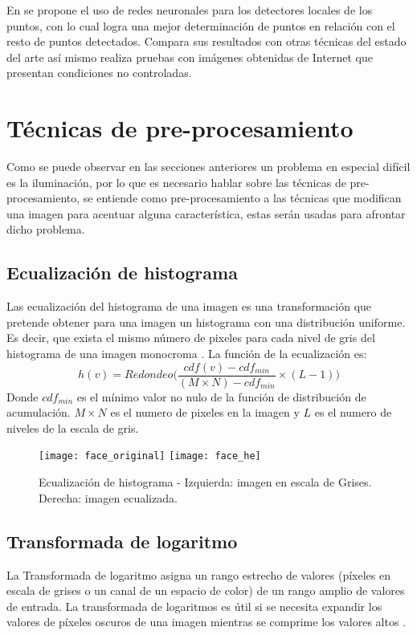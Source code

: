 En \cite{baltrusaitis2013constrained} se propone el uso de redes neuronales para los detectores locales de los puntos, con lo cual logra una mejor determinación de puntos en relación con el resto de puntos detectados. Compara sus resultados con otras técnicas del estado del arte así mismo realiza pruebas con imágenes obtenidas de Internet que presentan condiciones no controladas.

\section{Técnicas de pre-procesamiento}
Como se puede observar en las secciones anteriores un problema en especial difícil es la iluminación, por lo que es necesario hablar sobre las técnicas de pre-procesamiento, se entiende como pre-procesamiento a las técnicas que modifican una imagen para acentuar alguna característica, estas serán usadas para afrontar dicho problema.

\subsection{Ecualización de histograma}
Las ecualización del histograma de una imagen es una transformación que pretende obtener para una imagen un histograma con una distribución uniforme. Es decir, que exista el mismo número de pixeles para cada nivel de gris del histograma de una imagen monocroma \citep{orlova2002image}.
La función de la ecualización es:
\begin{equation}
h(v)=Redondeo\Bigg(\frac{cdf(v)-cdf_{min}}{(M\times N)-cdf_{min}} \times (L-1)\Bigg)
\end{equation}
Donde $cdf_{min}$ es el mínimo valor no nulo de la función de distribución de acumulación. $M\times N$ es el numero de pixeles en la imagen y $L$ es el numero de niveles de la escala de gris.

\begin{figure}[h]
\center
\texttt{[image: face\_original]}
\hspace{1cm}
\texttt{[image: face\_he]}
\caption{Ecualización de histograma - Izquierda: imagen en escala de Grises. Derecha: imagen ecualizada.}
\label{im:he}
\end{figure}


\subsection{Transformada de logaritmo}
La Transformada de logaritmo asigna un rango estrecho de valores (píxeles en escala de grises o un canal de un espacio de color) de un rango amplio de valores de entrada. La transformada de logaritmos es útil si se necesita expandir los valores de píxeles oscuros de una imagen mientras se comprime los valores altos \citep{thamiz2015liter}.

